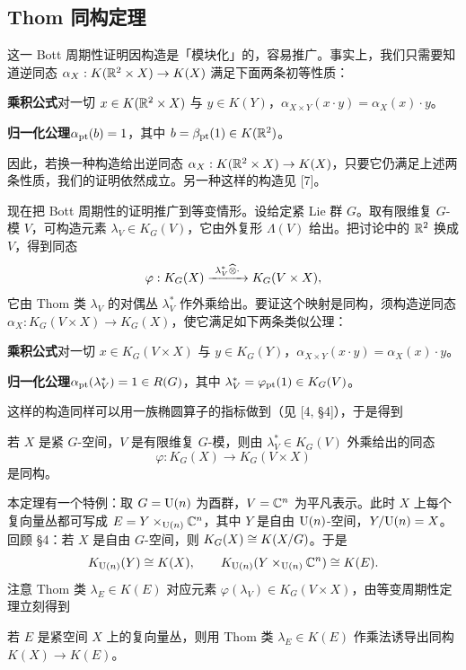 \subsection{Thom 同构定理}

这一 Bott 周期性证明因构造是「模块化」的，容易推广。事实上，我们只需要知道逆同态 $\alpha_X:K(\mathbb{R}^2\times X)\to K(X)$ 满足下面两条初等性质：

\textbf{乘积公式}\quad 对一切 $x\in K(\mathbb{R}^2\times X)$ 与 $y\in K(Y)$，$\alpha_{X\times Y}(x\cdot y)=\alpha_X(x)\cdot y$。

\textbf{归一化公理}\quad $\alpha_{\mathrm{pt}}(b)=1$，其中 $b=\beta_{\mathrm{pt}}(1)\in K(\mathbb{R}^2)$。

因此，若换一种构造给出逆同态 $\alpha_X:K(\mathbb{R}^2\times X)\to K(X)$，只要它仍满足上述两条性质，我们的证明依然成立。另一种这样的构造见 [7]。

现在把 Bott 周期性的证明推广到等变情形。设给定紧 Lie 群 $G$。取有限维复 $G$-模 $V$，可构造元素 $\lambda_V\in K_G(V)$，它由外复形 $\Lambda(V)$ 给出。把讨论中的 $\mathbb{R}^2$ 换成 $V$，得到同态
\[
\varphi:K_G(X)\xrightarrow{\ \lambda_V^*\BT\cdot\ }K_G(V\times X),
\]
它由 Thom 类 $\lambda_V$ 的对偶丛 $\lambda_V^*$ 作外乘给出。要证这个映射是同构，须构造逆同态 $\alpha_X:K_G(V\times X)\to K_G(X)$，使它满足如下两条类似公理：

\textbf{乘积公式}\quad 对一切 $x\in K_G(V\times X)$ 与 $y\in K_G(Y)$，$\alpha_{X\times Y}(x\cdot y)=\alpha_X(x)\cdot y$。

\textbf{归一化公理}\quad $\alpha_{\mathrm{pt}}(\lambda_V^*)=1\in R(G)$，其中 $\lambda_V^*=\varphi_{\mathrm{pt}}(1)\in K_G(V)$。

这样的构造同样可以用一族椭圆算子的指标做到（见 [4, §4]），于是得到

\begin{theorem}[等变周期性]
若 $X$ 是紧 $G$-空间，$V$ 是有限维复 $G$-模，则由 $\lambda_V^*\in K_G(V)$ 外乘给出的同态
\[
\varphi:K_G(X)\to K_G(V\times X)
\]
是同构。
\end{theorem}

本定理有一个特例：取 $G=\mathrm{U}(n)$ 为酉群，$V=\mathbb{C}^n$ 为平凡表示。此时 $X$ 上每个复向量丛都可写成 $E=Y\times_{\mathrm{U}(n)}\mathbb{C}^n$，其中 $Y$ 是自由 $\mathrm{U}(n)$-空间，$Y/\mathrm{U}(n)=X$。回顾 §4：若 $X$ 是自由 $G$-空间，则 $K_G(X)\cong K(X/G)$。于是
\[
K_{\mathrm{U}(n)}(Y)\cong K(X),\qquad K_{\mathrm{U}(n)}(Y\times_{\mathrm{U}(n)}\mathbb{C}^n)\cong K(E).
\]
注意 Thom 类 $\lambda_E\in K(E)$ 对应元素 $\varphi(\lambda_V)\in K_G(V\times X)$，由等变周期性定理立刻得到

\begin{corollary}
若 $E$ 是紧空间 $X$ 上的复向量丛，则用 Thom 类 $\lambda_E\in K(E)$ 作乘法诱导出同构 $K(X)\to K(E)$。
\end{corollary}

